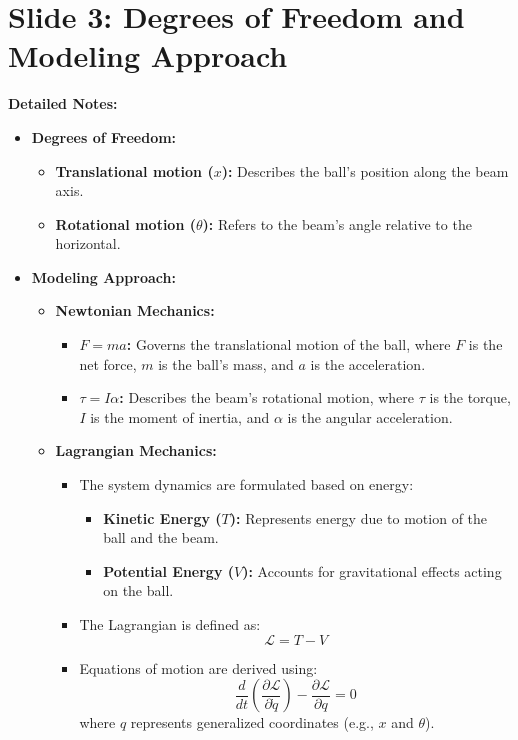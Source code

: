 \documentclass[12pt]{article}
\begin{document}
\section*{Slide 3: Degrees of Freedom and Modeling Approach}
\textbf{Detailed Notes:}
\begin{itemize}
    \item \textbf{Degrees of Freedom:}
    \begin{itemize}
        \item \textbf{Translational motion (\(x\)):} Describes the ball’s position along the beam axis.
        \item \textbf{Rotational motion (\(\theta\)):} Refers to the beam’s angle relative to the horizontal.
    \end{itemize}
    \item \textbf{Modeling Approach:}
    \begin{itemize}
        \item \textbf{Newtonian Mechanics:}
        \begin{itemize}
            \item \textbf{\(F = ma\):} Governs the translational motion of the ball, where \(F\) is the net force, \(m\) is the ball’s mass, and \(a\) is the acceleration.
            \item \textbf{\(\tau = I \alpha\):} Describes the beam’s rotational motion, where \(\tau\) is the torque, \(I\) is the moment of inertia, and \(\alpha\) is the angular acceleration.
        \end{itemize}
        \item \textbf{Lagrangian Mechanics:}
        \begin{itemize}
            \item The system dynamics are formulated based on energy:
            \begin{itemize}
                \item \textbf{Kinetic Energy (\(T\)):} Represents energy due to motion of the ball and the beam.
                \item \textbf{Potential Energy (\(V\)):} Accounts for gravitational effects acting on the ball.
            \end{itemize}
            \item The Lagrangian is defined as:
            \[
            \mathcal{L} = T - V
            \]
            \item Equations of motion are derived using:
            \[
            \frac{d}{dt}\left(\frac{\partial \mathcal{L}}{\partial \dot{q}}\right) - \frac{\partial \mathcal{L}}{\partial q} = 0
            \]
            where \(q\) represents generalized coordinates (e.g., \(x\) and \(\theta\)).
        \end{itemize}
    \end{itemize}
\end{itemize}
\end{document}
